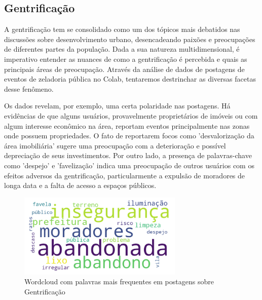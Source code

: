 \subsection{Gentrificação}

A gentrificação tem se consolidado como um dos tópicos mais debatidos nas discussões sobre desenvolvimento urbano, desencadeando paixões e preocupações de diferentes partes da população. Dada a sua natureza multidimensional, é imperativo entender as nuances de como a gentrificação é percebida e quais as principais áreas de preocupação. Através da análise de dados de postagens de eventos de zeladoria pública no Colab, tentaremos destrinchar as diversas facetas desse fenômeno.

Os dados revelam, por exemplo, uma certa polaridade nas postagens. Há evidências de que alguns usuários, provavelmente proprietários de imóveis ou com algum interesse econômico na área, reportam eventos principalmente nas zonas onde possuem propriedades. O fato de reportarem focos como 'desvalorização da área imobiliária' sugere uma preocupação com a deterioração e possível depreciação de seus investimentos. Por outro lado, a presença de palavras-chave como 'despejo' e 'favelização' indica uma preocupação de outros usuários com os efeitos adversos da gentrificação, particularmente a expulsão de moradores de longa data e a falta de acesso a espaços públicos.

\begin{figure}[htb]
	\centering
	\includegraphics[width=0.7\textwidth]{images/wordcloud_gentrification.png}
	\caption{Wordcloud com palavras mais frequentes em postagens sobre Gentrificação}
	\label{fig:wordcloud_gentrification}
\end{figure}

